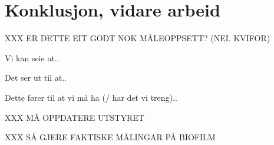 \section{Konklusjon, vidare arbeid}
XXX ER DETTE EIT GODT NOK MÅLEOPPSETT? (NEI. KVIFOR)

Vi kan seie at..

Det ser ut til at..

Dette fører til at vi må ha (/ har det vi treng)..
 
XXX MÅ OPPDATERE UTSTYRET

XXX SÅ GJERE FAKTISKE MÅLINGAR PÅ BIOFILM
